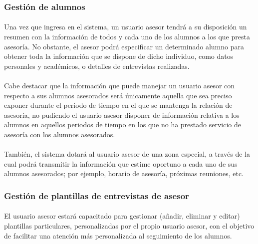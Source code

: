       \subsubsection{Gestión de alumnos}

      \paragraph{}Una vez que ingresa en el sistema, un usuario asesor tendrá
      a su disposición un resumen con la información de todos y cada uno de los
      alumnos a los que presta asesoría. No obstante, el asesor podrá
      especificar un determinado alumno para obtener toda la información que
      se dispone de dicho individuo, como datos personales y académicos, o
      detalles de entrevistas realizadas.

      \paragraph{}Cabe destacar que la información que puede manejar un usuario
      asesor con respecto a sus alumnos asesorados será únicamente aquella
      que sea preciso exponer durante el periodo de tiempo en el que se mantenga
      la relación de asesoría, no pudiendo el usuario asesor disponer
      de información relativa a los alumnos en aquellos periodos de tiempo en
      los que no ha prestado servicio de asesoría con los alumnos asesorados.

      \paragraph{}También, el sistema dotará al usuario asesor de una
      zona especial, a través de la cual podrá transmitir la información que
      estime oportuno a cada uno de sus alumnos asesorados; por ejemplo, horario
      de asesoría, próximas reuniones, etc.

      \subsubsection{Gestión de plantillas de entrevistas de asesor}

      \paragraph{}El usuario asesor estará capacitado para gestionar
      (añadir, eliminar y editar) plantillas particulares, personalizadas
      por el propio usuario asesor, con el objetivo de facilitar una atención
      más personalizada al seguimiento de los alumnos.

